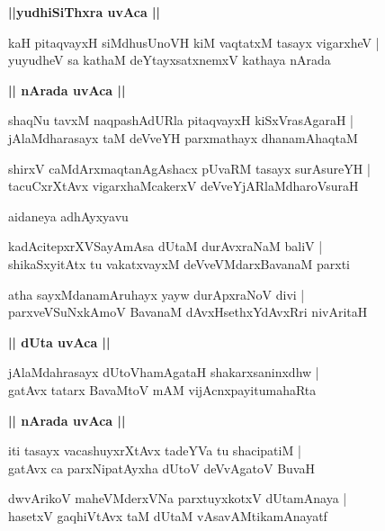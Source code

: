 \documentclass[twoside,12pt,openright]{book}
\newcounter{shloka}[chapter]
\def\uvaca#1{\centerline{{\large\textbf{#1}}}}
\begin{document}
\uvaca{||yudhiSiThxra uvAca ||}

\begin{shloka}%
kaH pitaqvayxH siMdhusUnoVH kiM vaqtatxM tasayx vigarxheV |\\
yuyudheV sa kathaM deYtayxsatxnemxV kathaya nArada 
\end{shloka}
\uvaca{|| nArada uvAca ||}

\begin{shloka}%
shaqNu tavxM naqpashAdURla pitaqvayxH kiSxVrasAgaraH |\\
jAlaMdharasayx taM deVveYH parxmathayx dhanamAhaqtaM
\end{shloka}

\begin{shloka}%
shirxV caMdArxmaqtanAgAshacx pUvaRM tasayx surAsureYH |\\
tacuCxrXtAvx vigarxhaMcakerxV deVveYjARlaMdharoVsuraH
\end{shloka}

\begin{center}
aidaneya adhAyxyavu
\end{center}

\begin{shloka}%
kadAcitepxrXVSayAmAsa dUtaM durAvxraNaM baliV |\\
shikaSxyitAtx tu vakatxvayxM deVveVMdarxBavanaM parxti
\end{shloka}

\begin{shloka}%
atha sayxMdanamAruhayx yayw durApxraNoV divi |\\
parxveVSuNxkAmoV BavanaM dAvxHsethxYdAvxRri nivAritaH 
\end{shloka}

\uvaca{|| dUta uvAca ||}

\begin{shloka}%
jAlaMdahrasayx dUtoVhamAgataH shakarxsaninxdhw |\\
gatAvx tatarx BavaMtoV mAM vijAcnxpayitumahaRta
\end{shloka}

\uvaca{|| nArada uvAca ||}

\begin{shloka}%
iti tasayx vacashuyxrXtAvx tadeYVa tu shacipatiM |\\
gatAvx ca parxNipatAyxha dUtoV deVvAgatoV BuvaH
\end{shloka}

\begin{shloka}%
dwvArikoV maheVMderxVNa parxtuyxkotxV dUtamAnaya |\\
hasetxV gaqhiVtAvx taM dUtaM vAsavAMtikamAnayatf
\end{shloka}
\end{document}
